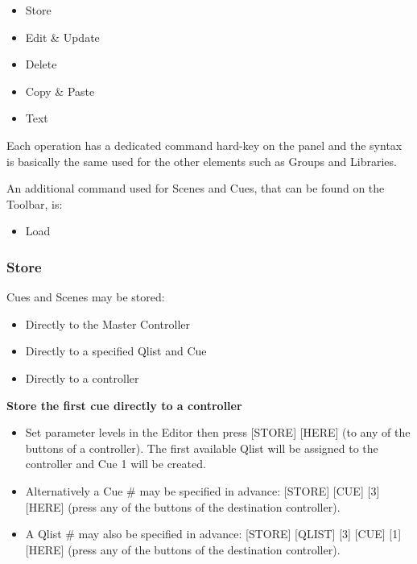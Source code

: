 \documentclass[
]{article}
\providecommand{\tightlist}{%
  \setlength{\itemsep}{0pt}\setlength{\parskip}{0pt}}
\begin{document}
\begin{itemize}
\item
  Store
\item
  Edit \& Update
\item
  Delete
\item
  Copy \& Paste
\item
  Text
\end{itemize}

Each operation has a dedicated command hard-key on the panel and the syntax is basically the same used for the other elements such as Groups and Libraries.

An additional command used for Scenes and Cues, that can be found on the Toolbar, is:

\begin{itemize}
\tightlist
\item
  Load
\end{itemize}

\hypertarget{store}{%
\subsubsection{Store}\label{store}}

Cues and Scenes may be stored:

\begin{itemize}
\item
  Directly to the Master Controller
\item
  Directly to a specified Qlist and Cue
\item
  Directly to a controller
\end{itemize}

\textbf{Store the first cue directly to a controller}

\begin{itemize}
\item
  Set parameter levels in the Editor then press {[}STORE{]} {[}HERE{]} (to any of the buttons of a controller). The first available Qlist will be assigned to the controller and Cue 1 will be created.
\item
  Alternatively a Cue \# may be specified in advance: {[}STORE{]} {[}CUE{]} {[}3{]} {[}HERE{]} (press any of the buttons of the destination controller).
\item
  A Qlist \# may also be specified in advance: {[}STORE{]} {[}QLIST{]} {[}3{]} {[}CUE{]} {[}1{]} {[}HERE{]} (press any of the buttons of the destination controller).
\end{itemize}
\end{document}
